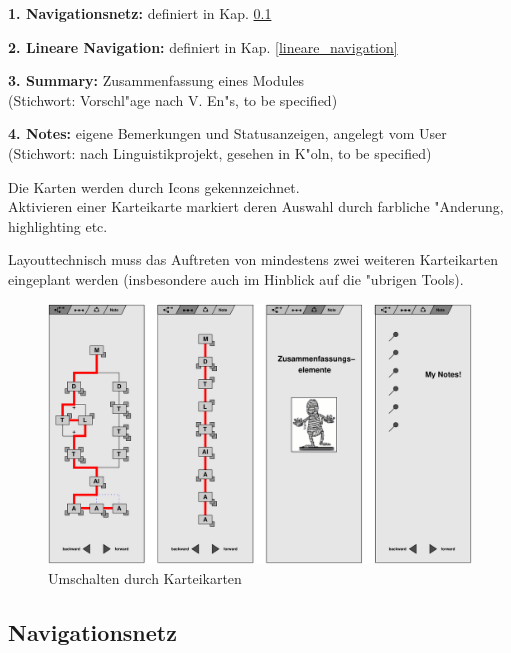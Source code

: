 \begin{list_sabina}
        \item \textbf{1. Navigationsnetz:}
        definiert in Kap. \ref{navigationsnetz}
        \item \textbf{2. Lineare Navigation:}
	definiert in Kap. \ref{lineare_navigation}
         \item \textbf{3. Summary:}
        Zusammenfassung eines Modules \\
	(Stichwort: Vorschl"age nach V. En"s, to be specified)
        \item \textbf{4. Notes:}
        eigene Bemerkungen und Statusanzeigen, angelegt vom User \\
	(Stichwort: nach Linguistikprojekt, gesehen in K"oln, to be specified)
\end{list_sabina}

Die Karten werden durch Icons gekennzeichnet.\\
Aktivieren einer Karteikarte markiert deren Auswahl durch farbliche
"Anderung, highlighting etc.

Layouttechnisch muss das Auftreten von mindestens zwei weiteren
Karteikarten eingeplant werden (insbesondere auch im Hinblick auf die
"ubrigen Tools).

\begin{figure}[h]
\begin{center}
\ifx\pdfoutput\undefined
\else
  \includegraphics{Skizzen/all_cards.pdf}
\fi
\caption{Umschalten durch Karteikarten}
\end{center}
\end{figure}


\clearpage

\subsection{Navigationsnetz}\label{navigationsnetz}


